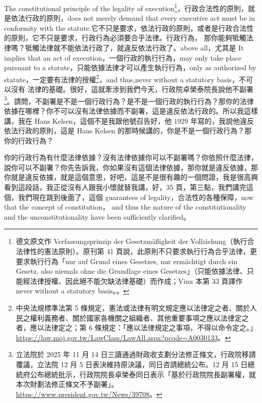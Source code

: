 \hypertarget{w05:cue:119}{}The constitutional principle of the legality of execution\footnote{德文原文作 Verfassungsprinzip der Gesetzmäßigkeit der Vollziehung（執行合法律性的憲法原則）。原刊第 41 頁說，此原則不只要求執行行為合乎法律，更要求執行行為「nur auf Grund eines Gesetzes, nur ermächtigt durch ein Gesetz, also niemals ohne die Grundlage eines Gesetzes」（只能依據法律、只能經法律授權、因此絕不能欠缺法律基礎）而作成；Vinx 本第 33 頁譯作 never without a statutory basis。\cite[33]{kelsen2015}。}，行政合法性的原則，就是依法行政的原則，does not merely demand that every executive act must be in conformity with the statute.它不只是要求，依法行政的原則，或者是行政合法性的原則，它不只是要求，行政行為必須要合乎法律。行政行為，
\hypertarget{w05:cue:120}{}那你能夠牴觸法律嗎？牴觸法律就不能依法行政了，就違反依法行政了。above all，尤其是 It implies that an act of execution，一個行政的執行行為，may only take place pursuant to a statute，只能依據法律才可以產生執行行為，only as authorized by statute，一定要有法律的授權\footnote{中央法規標準法第 5 條規定，憲法或法律有明文規定應以法律定之者、關於人民之權利義務者、關於國家各機關之組織者、其他重要事項之應以法律定之者，應以法律定之；第 6 條規定：「應以法律規定之事項，不得以命令定之。」\url{https://law.moj.gov.tw/LawClass/LawAll.aspx?pcode=A0030133}。}，and thus,never without a statutory basis，不可以沒有
\hypertarget{w05:cue:121}{}法律的基礎。很好，這就牽涉到我們今天，行政院卓榮泰院長說他不副署\footnote{立法院於 2025 年 11 月 14 日三讀通過財政收支劃分法修正條文，行政院移請覆議，立法院 12 月 5 日表決維持原決議，同日咨請總統公布。12 月 15 日總統府公布總統批示，行政院院長卓榮泰同日表示「基於行政院院長副署權，就本次財劃法修正條文不予副署」。\url{https://www.president.gov.tw/News/39708}。}。請問，不副署是不是一個行政行為？是不是一個行政的執行行為？那你的法律依據在哪裡？你不可以沒有法律依據而不副署，這是違反依法行政的。所以我這樣講，我在 Hans Kelsen，這個不是我跟他號召告好，他 1929 年寫的，我說他違反依法行政的原則，這是 Hans Kelsen 的那時候講的，你是不是一個行政行為？那你的行政行為？

\hypertarget{w05:cue:122}{}你的行政行為有什麼法律依據？沒有法律依據你可以不副署嗎？你依照什麼法律，說你可以不副署？你先告訴我，你如果沒有這個法律依據，那你就是違反依據，那你就是違反依據，就是這個意思，好吧，這是不是很有趣的一個問證，我是很高興看到這段話，我正從沒有人跟我小懷就替我講，好，35 頁，第三點，我們講完這個，我們現在跳到後面了，這個 guarantees of legality，合法性的各種保障，now that the concept of constitution，
\hypertarget{w05:cue:123}{}and thus the nature of the constitutionality and the unconstitutionality have been sufficiently clarified。


